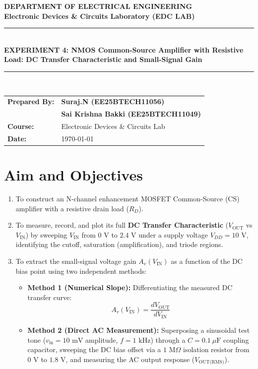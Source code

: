 \documentclass[11pt,a4paper]{article}
\begin{document}
\begin{center}
    {\LARGE \textbf{\color{primary} DEPARTMENT OF ELECTRICAL ENGINEERING}}\\[0.2cm]
    {\large \textbf{Electronic Devices \& Circuits Laboratory (EDC LAB)}}\\[0.4cm]
    \rule{\linewidth}{1pt}\\[0.3cm]
    {\Large \textbf{EXPERIMENT 4: NMOS Common-Source Amplifier with Resistive Load: DC Transfer Characteristic and Small-Signal Gain}}\\[0.3cm]
    \rule{\linewidth}{1pt}\\[0.4cm]
    
    \begin{tabular}{ll}
        \textbf{Prepared By:} & \textbf{Suraj.N (EE25BTECH11056)} \\
                              & \textbf{Sai Krishna Bakki (EE25BTECH11049)} \\
        \textbf{Course:}      & Electronic Devices \& Circuits Lab \\
        \textbf{Date:}        & \today
    \end{tabular}
\end{center}

\vspace{0.3cm}

\section{Aim and Objectives}
\begin{enumerate}
    \item To construct an N-channel enhancement MOSFET Common-Source (CS) amplifier with a resistive drain load ($R_D$).
    \item To measure, record, and plot its full \textbf{DC Transfer Characteristic} ($V_{\text{OUT}}$ vs $V_{\text{IN}}$) by sweeping $V_{\text{IN}}$ from $0\text{ V}$ to $2.4\text{ V}$ under a supply voltage $V_{DD} = 10\text{ V}$, identifying the cutoff, saturation (amplification), and triode regions.
    \item To extract the small-signal voltage gain $A_v(V_{\text{IN}})$ as a function of the DC bias point using two independent methods:
    \begin{itemize}
        \item \textbf{Method 1 (Numerical Slope):} Differentiating the measured DC transfer curve:
        \begin{equation*}
            A_v(V_{\text{IN}}) = \frac{dV_{\text{OUT}}}{dV_{\text{IN}}}
        \end{equation*}
        \item \textbf{Method 2 (Direct AC Measurement):} Superposing a sinusoidal test tone ($v_{\text{in}} = 10\text{ mV}$ amplitude, $f = 1\text{ kHz}$) through a $C = 0.1\ \mu\text{F}$ coupling capacitor, sweeping the DC bias offset via a $1\text{ M}\Omega$ isolation resistor from $0\text{ V}$ to $1.8\text{ V}$, and measuring the AC output response ($V_{\text{OUT(RMS)}}$).
    \end{itemize}
\end{enumerate}
\end{document}
